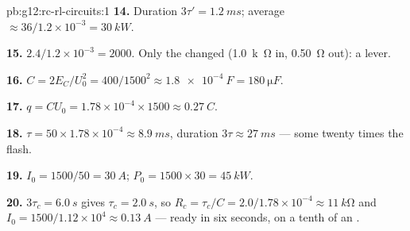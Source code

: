 \begin{solution}{pb:g12:rc-rl-circuits:1}
\textbf{14.} Duration $3\tau' = \qty{1.2}{ms}$; average 
$\approx 36/1.2\times10^{-3} = \qty{30}{kW}$.

\textbf{15.} $2.4/1.2\times10^{-3} = 2000$. Only the  changed
(\qty{1.0}{k\ohm} in, \qty{0.50}{\ohm} out): a  lever.

\textbf{16.} $C = 2E_C/U_0^2 = 400/1500^2 \approx \qty{1.8e-4}{F} =
\qty{180}{\micro F}$.

\textbf{17.} $q = CU_0 = 1.78\times10^{-4} \times 1500 \approx
\qty{0.27}{C}$.

\textbf{18.} $\tau = 50 \times 1.78\times10^{-4} \approx \qty{8.9}{ms}$,
duration $3\tau \approx \qty{27}{ms}$ --- some twenty times the flash.

\textbf{19.} $I_0 = 1500/50 = \qty{30}{A}$;
$P_0 = 1500 \times 30 = \qty{45}{kW}$.

\textbf{20.} $3\tau_c = \qty{6.0}{s}$ gives $\tau_c = \qty{2.0}{s}$, so
$R_c = \tau_c/C = 2.0/1.78\times10^{-4} \approx \qty{11}{k\ohm}$ and
$I_0 = 1500/1.12\times10^{4} \approx \qty{0.13}{A}$ --- ready in six
seconds, on a tenth of an .
\end{solution}
